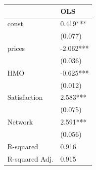 \begin{tabular}{ll}
\hline
               & OLS        \\
\hline
const          & 0.419***   \\
               & (0.077)    \\
prices         & -2.062***  \\
               & (0.036)    \\
HMO            & -0.625***  \\
               & (0.012)    \\
Satisfaction   & 2.583***   \\
               & (0.075)    \\
Network        & 2.591***   \\
               & (0.056)    \\
R-squared      & 0.916      \\
R-squared Adj. & 0.915      \\
\hline
\end{tabular}